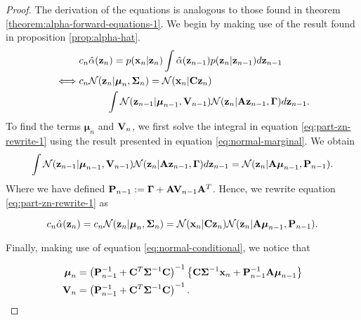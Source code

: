 \documentclass[11pt]{article}
\numberwithin{equation}{section}
\newcommand{\x}{{\bf x}}
\newcommand{\z}{{\bf z}}
\newcommand{\N}{\mathcal{N}}
\begin{document}
\begin{proof}
	The derivation of the equations is analogous to those found in theorem \ref{theorem:alpha-forward-equations-1}. We begin by making use of the result found in proposition \ref{prop:alpha-hat}. 
	\begin{align}
		&c_n \hat\alpha(\z_n) = p(\x_n\vert\z_n) \int \hat\alpha(\z_{n-1})p(\z_n \vert \z_{n-1}) d\z_{n-1}\\
		\iff& c_n \N(\z_n \vert \boldsymbol\mu_n, \boldsymbol\Sigma_n) = \N(\x_n \vert {\bf C}\z_n) \nonumber \\
			&\hspace{1cm} \int \N(\z_{n-1} \vert \boldsymbol\mu_{n-1}, {\bf V}_{n-1}) \N(\z_n \vert {\bf A}\z_{n-1}, \boldsymbol\Gamma) d\z_{n-1} \label{eq:part-zn-rewrite-1}.
	\end{align}
	To find the terms $\boldsymbol\mu_n$ and ${\bf V}_n$, we first solve the integral in equation \eqref{eq:part-zn-rewrite-1} using the result presented in equation \eqref{eq:normal-marginal}. We obtain
	\begin{equation}
		\int \N(\z_{n-1} \vert \boldsymbol\mu_{n-1}, {\bf V}_{n-1}) \N(\z_n \vert {\bf A}\z_{n-1}, \boldsymbol\Gamma) d\z_{n-1} = \N(\z_n \vert {\bf A} \boldsymbol\mu_{n-1}, {\bf P}_{n-1}).
	\end{equation}
	Where we have defined ${\bf P}_{n-1} := \boldsymbol\Gamma + {\bf A}{\bf V}_{n-1}{\bf A}^T$. Hence, we rewrite equation \eqref{eq:part-zn-rewrite-1} as 
	
	\begin{equation} \label{eq:part-cnzn-rewrite}
		c_n\hat\alpha(\z_n)  = c_n \N(\z_n \vert \boldsymbol\mu_n, \boldsymbol\Sigma_n) = \N(\x_n \vert {\bf C}\z_n)  \N(\z_n \vert {\bf A} \boldsymbol\mu_{n-1}, {\bf P}_{n-1}).
	\end{equation}
	
	Finally, making use of equation \eqref{eq:normal-conditional}, we notice that
	
	\begin{align}
		\boldsymbol{\mu}_n &= \left({\bf P}_{n-1}^{-1} + {\bf C}^T \boldsymbol\Sigma^{-1}{\bf C}\right)^{-1} \left\{{\bf C}\boldsymbol\Sigma^{-1}\x_n + {\bf P}_{n-1}^{-1}{\bf A}\boldsymbol\mu_{n-1}\right\}\\
		{\bf V}_n &= \left({\bf P}_{n-1}^{-1} + {\bf C}^T \boldsymbol\Sigma^{-1}{\bf C}\right)^{-1}.
	\end{align}
	

\end{proof}
\end{document}
